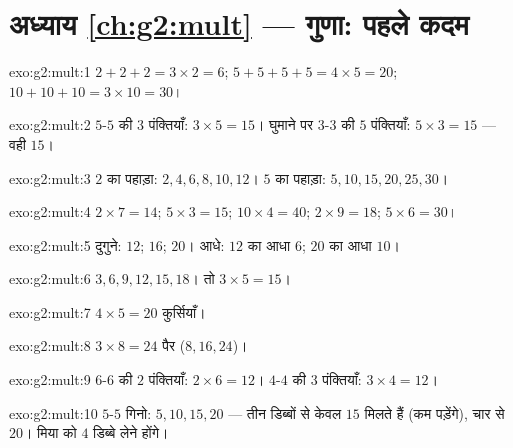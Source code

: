 \section*{अध्याय \ref{ch:g2:mult} --- गुणा: पहले कदम}

\begin{solution}{exo:g2:mult:1}
$2 + 2 + 2 = 3 \times 2 = 6$; \quad
$5 + 5 + 5 + 5 = 4 \times 5 = 20$; \quad
$10 + 10 + 10 = 3 \times 10 = 30$।
\end{solution}

\begin{solution}{exo:g2:mult:2}
$5$-$5$ की $3$ पंक्तियाँ: $3 \times 5 = 15$। घुमाने पर $3$-$3$ की
$5$ पंक्तियाँ: $5 \times 3 = 15$ --- वही $15$।
\end{solution}

\begin{solution}{exo:g2:mult:3}
$2$ का पहाड़ा: $2, 4, 6, 8, 10, 12$। $5$ का पहाड़ा:
$5, 10, 15, 20, 25, 30$।
\end{solution}

\begin{solution}{exo:g2:mult:4}
$2 \times 7 = 14$; \quad $5 \times 3 = 15$; \quad
$10 \times 4 = 40$; \quad $2 \times 9 = 18$; \quad
$5 \times 6 = 30$।
\end{solution}

\begin{solution}{exo:g2:mult:5}
दुगुने: $12$; $16$; $20$। आधे: $12$ का आधा $6$; $20$ का
आधा $10$।
\end{solution}

\begin{solution}{exo:g2:mult:6}
$3, 6, 9, 12, 15, 18$। तो $3 \times 5 = 15$।
\end{solution}

\begin{solution}{exo:g2:mult:7}
$4 \times 5 = 20$ कुर्सियाँ।
\end{solution}

\begin{solution}{exo:g2:mult:8}
$3 \times 8 = 24$ पैर ($8, 16, 24$)।
\end{solution}

\begin{solution}{exo:g2:mult:9}
$6$-$6$ की $2$ पंक्तियाँ: $2 \times 6 = 12$। $4$-$4$ की $3$ पंक्तियाँ:
$3 \times 4 = 12$।
\end{solution}

\begin{solution}{exo:g2:mult:10}
$5$-$5$ गिनो: $5, 10, 15, 20$ --- तीन डिब्बों से केवल $15$
मिलते हैं (कम पड़ेंगे), चार से $20$। मिया को $4$ डिब्बे लेने होंगे।

\end{solution}
